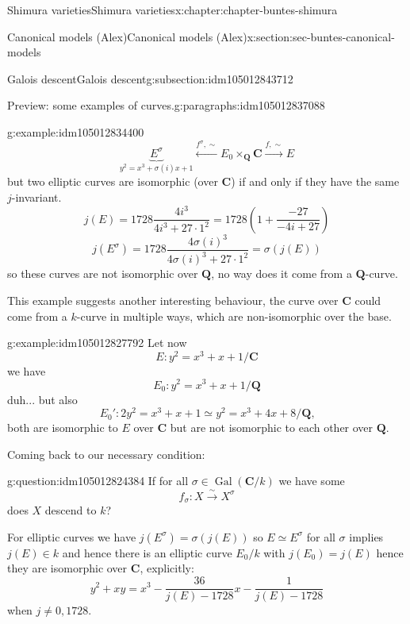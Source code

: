 \documentclass[oneside,10pt,]{book}
\numberwithin{equation}{section}
\newcommand{\QQ}{\mathbf{Q}}
\newcommand{\CC}{\mathbf{C}}
\newcommand{\Gal}[2]{\operatorname{Gal}(#1/#2)}
\begin{document}
\begin{chapterptx}{Shimura varieties}{}{Shimura varieties}{}{}{x:chapter:chapter-buntes-shimura}
\begin{sectionptx}{Canonical models (Alex)}{}{Canonical models (Alex)}{}{}{x:section:sec-buntes-canonical-models}
\begin{subsectionptx}{Galois descent}{}{Galois descent}{}{}{g:subsection:idm105012843712}
\begin{paragraphs}{Preview: some examples of curves.}{g:paragraphs:idm105012837088}
\begin{example}{}{g:example:idm105012834400}
\begin{equation*}
\underbrace{E^\sigma}_{y^2 = x^3 + \sigma(i)x + 1} \xleftarrow{f^\sigma, \sim} E_0 \times_\QQ \CC \xrightarrow{f,\sim} E
\end{equation*}
but two elliptic curves are isomorphic (over \(\CC\)) if and only if they have the same \(j\)-invariant.%
\begin{equation*}
j(E) = 1728 \frac{4i^3}{4i^3 + 27\cdot 1^2} = 1728\left(1+ \frac{ - 27}{-4i + 27}\right)
\end{equation*}
%
\begin{equation*}
j(E^\sigma) = 1728 \frac{4\sigma(i)^3}{4\sigma(i)^3 + 27\cdot 1^2} = \sigma(j(E))
\end{equation*}
so these curves are not isomorphic over \(\QQ\), no way does it come from a \(\QQ\)-curve.%
\end{example}
This example suggests another interesting behaviour, the curve over \(\CC\) could come from  a \(k\)-curve in multiple ways, which are non-isomorphic over the base.%
\begin{example}{}{g:example:idm105012827792}%
Let now%
\begin{equation*}
E \colon y^2 = x^3 + x + 1/\CC
\end{equation*}
we have%
\begin{equation*}
E_0 \colon y^2 = x^3 + x + 1/\QQ
\end{equation*}
duh... but also%
\begin{equation*}
E_0' \colon 2 y^2 = x^3 + x + 1 \simeq y^2 = x^3 + 4 x + 8/\QQ\text{,}
\end{equation*}
both are isomorphic to \(E\) over \(\CC\) but are not isomorphic to each other over \(\QQ\).%
\end{example}
Coming back to our necessary condition:%
\begin{question}{}{g:question:idm105012824384}%
If for all \(\sigma \in \Gal{\CC}{k}\) we have some%
\begin{equation*}
f_\sigma \colon X\xrightarrow{\sim} X^\sigma
\end{equation*}
does \(X\) descend to \(k\)?%
\end{question}
For elliptic curves we have \(j(E^\sigma) = \sigma(j(E))\) so \(E \simeq E^\sigma\) for all \(\sigma\) implies \(j(E) \in k\) and hence there is an elliptic curve \(E_0/ k\) with \(j(E_0) = j(E)\) hence they are isomorphic over \(\CC\), explicitly:%
\begin{equation*}
y^2 + xy = x^3 - \frac{36}{j(E) - 1728} x - \frac{1}{j(E) - 1728}
\end{equation*}
when \(j\ne 0,1728\).%

\end{paragraphs}
\end{subsectionptx}
\end{sectionptx}
\end{chapterptx}
\end{document}
